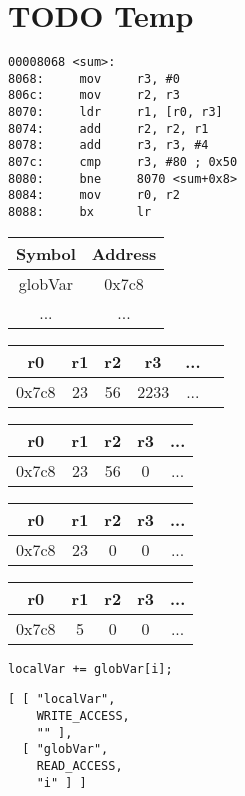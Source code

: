\chapter{TODO Temp}

\begin{minipage}{.5\textwidth}
\begin{lstlisting}
00008068 <sum>:
8068:     mov     r3, #0
806c:     mov     r2, r3
8070:     ldr     r1, [r0, r3]
8074:     add     r2, r2, r1
8078:     add     r3, r3, #4
807c:     cmp     r3, #80 ; 0x50
8080:     bne     8070 <sum+0x8>
8084:     mov     r0, r2
8088:     bx      lr
\end{lstlisting}
\end{minipage}

\begin{tabular}{|c|c|}
  \hline
  \textbf{Symbol} & \textbf{Address} \\
    \hline
  globVar & 0x7c8  \\
  \hline
  ... & ... \\
    \hline
\end{tabular}

\begin{tabular}{|c|c|c|c|c|c|}
  \hline
  \textbf{r0} & \textbf{r1} & \textbf{r2} & \textbf{r3} & ... \\
    \hline
  0x7c8 & 23 & 56 & 2233 & ... \\
    \hline
\end{tabular}

\begin{tabular}{|c|c|c|c|c|}
  \hline
  \textbf{r0} & \textbf{r1} & \textbf{r2} & \textbf{r3} & ... \\
    \hline
  0x7c8 & 23 & 56 & 0 & ... \\
    \hline
\end{tabular}

\begin{tabular}{|c|c|c|c|c|}
  \hline
  \textbf{r0} & \textbf{r1} & \textbf{r2} & \textbf{r3} & ... \\
    \hline
  0x7c8 & 23 & 0 & 0 & ... \\
    \hline
\end{tabular}

\begin{tabular}{|c|c|c|c|c|}
  \hline
  \textbf{r0} & \textbf{r1} & \textbf{r2} & \textbf{r3} & ... \\
    \hline
  0x7c8 & 5 & 0 & 0 & ... \\
    \hline
\end{tabular}

\begin{minipage}{.4\textwidth}
\begin{lstlisting}[numbers=none]
localVar += globVar[i];
\end{lstlisting}
\end{minipage}

\begin{minipage}{.4\textwidth}
\begin{lstlisting}[numbers=none]
[ [ "localVar",
    WRITE_ACCESS,
    "" ],
  [ "globVar",
    READ_ACCESS,
    "i" ] ]
\end{lstlisting}
\end{minipage}